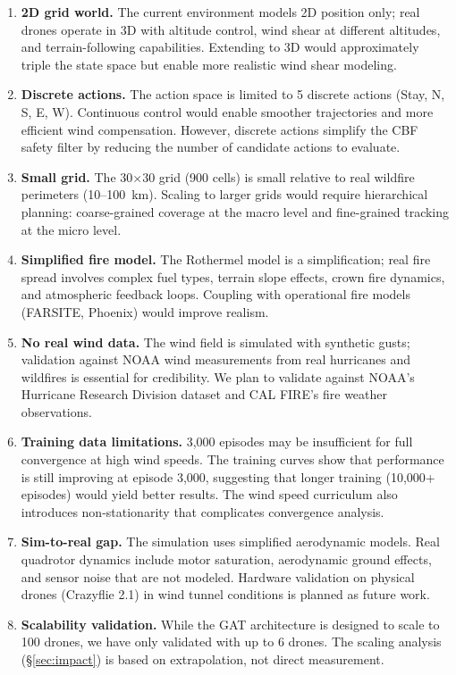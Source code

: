 \documentclass[12pt,a4paper]{article}
\begin{document}
\begin{enumerate}[leftmargin=*]
    \item \textbf{2D grid world.} The current environment models 2D position only; real drones operate in 3D with altitude control, wind shear at different altitudes, and terrain-following capabilities. Extending to 3D would approximately triple the state space but enable more realistic wind shear modeling.
    
    \item \textbf{Discrete actions.} The action space is limited to 5 discrete actions (Stay, N, S, E, W). Continuous control would enable smoother trajectories and more efficient wind compensation. However, discrete actions simplify the CBF safety filter by reducing the number of candidate actions to evaluate.
    
    \item \textbf{Small grid.} The 30$\times$30 grid (900 cells) is small relative to real wildfire perimeters (10--100~km). Scaling to larger grids would require hierarchical planning: coarse-grained coverage at the macro level and fine-grained tracking at the micro level.
    
    \item \textbf{Simplified fire model.} The Rothermel model is a simplification; real fire spread involves complex fuel types, terrain slope effects, crown fire dynamics, and atmospheric feedback loops. Coupling with operational fire models (FARSITE, Phoenix) would improve realism.
    
    \item \textbf{No real wind data.} The wind field is simulated with synthetic gusts; validation against NOAA wind measurements from real hurricanes and wildfires is essential for credibility. We plan to validate against NOAA's Hurricane Research Division dataset and CAL FIRE's fire weather observations.
    
    \item \textbf{Training data limitations.} 3,000 episodes may be insufficient for full convergence at high wind speeds. The training curves show that performance is still improving at episode 3,000, suggesting that longer training (10,000+ episodes) would yield better results. The wind speed curriculum also introduces non-stationarity that complicates convergence analysis.
    
    \item \textbf{Sim-to-real gap.} The simulation uses simplified aerodynamic models. Real quadrotor dynamics include motor saturation, aerodynamic ground effects, and sensor noise that are not modeled. Hardware validation on physical drones (Crazyflie 2.1) in wind tunnel conditions is planned as future work.
    
    \item \textbf{Scalability validation.} While the GAT architecture is designed to scale to 100 drones, we have only validated with up to 6 drones. The scaling analysis (\S\ref{sec:impact}) is based on extrapolation, not direct measurement.
\end{enumerate}
\end{document}
